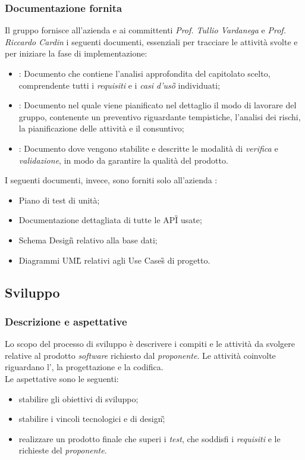 \subsubsection{Documentazione fornita}
Il gruppo fornisce all'azienda \proponente{} e ai committenti \textit{Prof. Tullio Vardanega} e \textit{Prof. Riccardo Cardin} i seguenti documenti, essenziali per tracciare le attività svolte e per iniziare la fase di implementazione:
\begin{itemize}
	\item \AdR{}: Documento che contiene l'analisi approfondita del capitolato scelto, comprendente tutti i \emph{requisiti} e i \emph{casi d'uso\G{}} individuati;
	\item \PdP{}: Documento nel quale viene pianificato nel dettaglio il modo di lavorare del gruppo, contenente un preventivo riguardante tempistiche, l'analisi dei rischi, la pianificazione delle attività e il consuntivo;
	\item \PdQ{}: Documento dove vengono stabilite e descritte le modalità di \emph{verifica} e \emph{validazione}, in modo da garantire la qualità del prodotto.  \\
\end{itemize}
I seguenti documenti, invece, sono forniti solo all'azienda \proponente{}:
\begin{itemize}
	\item Piano di test di unità;
	\item Documentazione dettagliata di tutte le API\G{} usate;
	\item Schema Design\G{} relativo alla base dati;
	\item Diagrammi UML\G{} relativi agli Use Cases\G{} di progetto.
\end{itemize}

\subsection{Sviluppo}
\subsubsection{Descrizione e aspettative}
Lo scopo del processo di sviluppo è descrivere i compiti e le attività da svolgere relative al prodotto \emph{software} richiesto dal \emph{proponente}.
Le attività coinvolte riguardano l'\AdR{}, la progettazione e la codifica. \\
Le aspettative sono le seguenti:
\begin{itemize}
	\item stabilire gli obiettivi di sviluppo;
	\item stabilire i vincoli tecnologici e di design\G;
	\item realizzare un prodotto finale che superi i \emph{test}, che soddisfi i \emph{requisiti} e le richieste del \emph{proponente}. 
\end{itemize}

